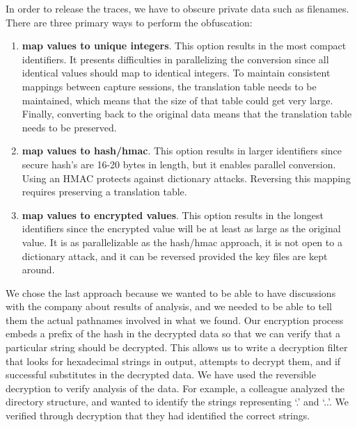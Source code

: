 In order to release the traces, we have to obscure private data such
as filenames.  There are three primary ways to perform the obfuscation: 

\begin{enumerate}

\item {\bf map values to unique integers}.  This option results in the
most compact identifiers.  It presents difficulties in parallelizing
the conversion since all identical values should map to
identical integers.  To maintain consistent mappings between capture
sessions, the translation table needs to be maintained, which means
that the size of that table could get very large.  Finally, converting
back to the original data means that the translation table needs to be
preserved.

\item {\bf map values to hash/hmac}.  This option results in larger
identifiers since secure hash's are 16-20 bytes in length, but it
enables parallel conversion.  Using an HMAC protects against
dictionary attacks.  Reversing this mapping requires preserving a
translation table.


\item {\bf map values to encrypted values}.  This option results in
the longest identifiers since the encrypted value will be at least as
large as the original value.  It is as parallelizable as the hash/hmac
approach, it is not open to a dictionary attack, and it can be
reversed provided the key files are kept around.

\end{enumerate}

We chose the last approach because we wanted to be able to have
discussions with the company about results of analysis, and we needed
to be able to tell them the actual pathnames involved in what we
found.  Our encryption process embeds a prefix of the hash in the
decrypted data so that we can verify that a particular string should
be decrypted.  This allows us to write a decryption filter that looks
for hexadecimal strings in output, attempts to decrypt them, and if
successful substitutes in the decrypted data.  We have used the
reversible decryption to verify analysis of the data.  For example, a
colleague analyzed the directory structure, and wanted to identify the
strings representing `.' and `..'.  We verified through decryption
that they had identified the correct strings.

